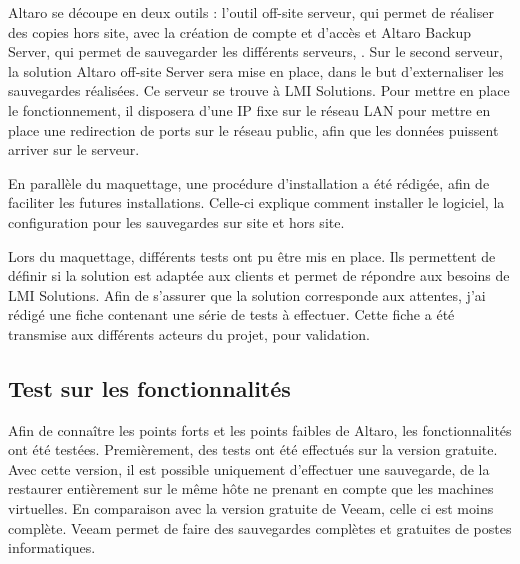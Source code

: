 \documentclass[pfe]{tnreport} %
\begin{document}
Altaro se découpe en deux outils : l'outil off-site serveur, qui permet de réaliser des copies hors site, avec la création de compte et d'accès et Altaro Backup Server, qui permet de sauvegarder les différents serveurs, . 
Sur le second serveur, la solution Altaro off-site Server sera mise en place, dans le but d'externaliser les sauvegardes réalisées. \newline 
Ce serveur se trouve à LMI Solutions. Pour mettre en place le fonctionnement, il disposera d'une IP fixe sur le réseau LAN pour mettre en place une redirection de ports sur le réseau public, afin que les données puissent arriver sur le serveur.

En parallèle du maquettage, une procédure d'installation a été rédigée, afin de faciliter les futures installations.\newline
Celle-ci explique comment installer le logiciel, la configuration pour les sauvegardes sur site et hors site.

Lors du maquettage, différents tests ont pu être mis en place. Ils permettent de définir si la solution est adaptée aux clients et permet de répondre aux besoins de LMI Solutions. \newline
Afin de s'assurer que la solution corresponde aux attentes, j'ai rédigé une fiche contenant une série de tests à effectuer. Cette fiche a été transmise aux différents acteurs du projet, pour validation.

\subsection{Test sur les fonctionnalités}


Afin de connaître les points forts et les points faibles de Altaro, les fonctionnalités ont été testées. \newline
Premièrement, des tests ont été effectués sur la version gratuite. Avec cette version, il est possible uniquement d'effectuer une sauvegarde, de la restaurer entièrement sur le même hôte ne prenant en compte que les machines virtuelles.\newline 
En comparaison avec la version gratuite de Veeam, celle ci est moins complète. Veeam permet de faire des sauvegardes complètes et gratuites de postes informatiques. \newline
\end{document}
